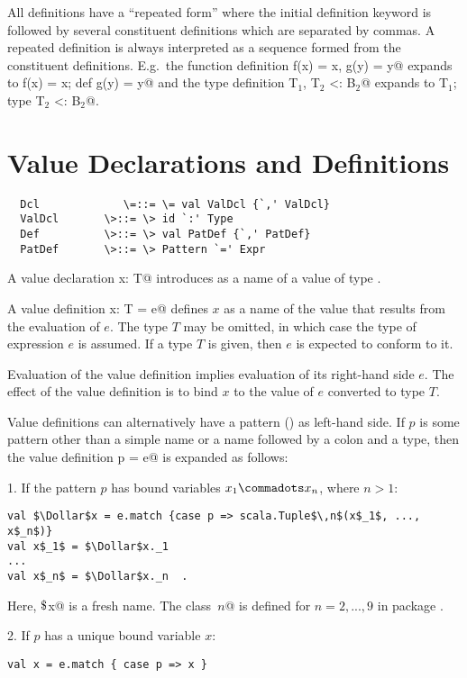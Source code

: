 \documentclass[11pt]{report}
\begin{document}
All definitions have a ``repeated form'' where the initial
definition keyword is followed by several constituent definitions
which are separated by commas.  A repeated definition is
always interpreted as a sequence formed from the
constituent definitions. E.g.\ the function definition
\verb@def f(x) = x, g(y) = y@ expands to
\verb@def f(x) = x; def g(y) = y@ and
the type definition
\verb@type T$_1$, T$_2$ <: B$_2$@ expands to
\verb@type T$_1$; type T$_2$ <: B$_2$@.

\section{Value Declarations and Definitions}
\label{sec:valdef}

\syntax\begin{verbatim}
  Dcl             \=::= \= val ValDcl {`,' ValDcl}
  ValDcl       \>::= \> id `:' Type
  Def          \>::= \> val PatDef {`,' PatDef}
  PatDef       \>::= \> Pattern `=' Expr
\end{verbatim}

A value declaration \verb@val x: T@ introduces \verb@x@ as a name of a value of
type \verb@T@.  

A value definition \verb@val x: T = e@ defines $x$ as a name of the
value that results from the evaluation of $e$. The type $T$ may be
omitted, in which case the type of expression $e$ is assumed.
If a type $T$ is given, then $e$ is expected to conform to it.

Evaluation of the value definition implies evaluation of its
right-hand side $e$.  The effect of the value definition is to bind
$x$ to the value of $e$ converted to type $T$.

Value definitions can alternatively have a pattern
() as left-hand side.  If $p$ is some pattern other
than a simple name or a name followed by a colon and a type, then the
value definition \verb@val p = e@ is expanded as follows:

1. If the pattern $p$ has bound variables $x_1 \commadots x_n$, where $n > 1$:
\begin{verbatim}
val $\Dollar$x = e.match {case p => scala.Tuple$\,n$(x$_1$, ..., x$_n$)}
val x$_1$ = $\Dollar$x._1
...
val x$_n$ = $\Dollar$x._n  .
\end{verbatim}
Here, \verb@$\Dollar$x@ is a fresh name.  The class
\verb@Tuple$\,n$@ is defined for $n = 2,...,9$ in package
\verb@scala@.

2. If $p$ has a unique bound variable $x$:
\begin{verbatim}
val x = e.match { case p => x }
\end{verbatim}
\end{document}
